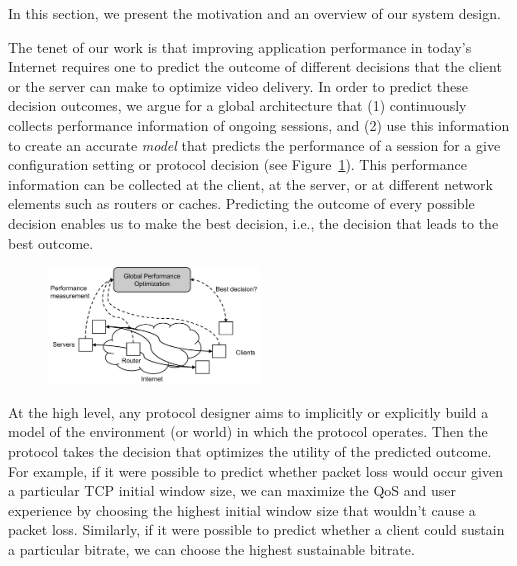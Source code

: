 \label{sec:overview}

In this section, we present the motivation and an overview of our
system design.

The tenet of our work is that improving application performance in
today's Internet requires one to predict the outcome of different
decisions that the client or the server can make to optimize video
delivery. In order to predict these decision outcomes,
we argue for a global architecture that (1) continuously collects
performance information of ongoing sessions, and (2) use this
information to create an accurate \emph{model} that predicts the
performance of a session for a give configuration setting or protocol
decision (see Figure~\ref{fig:global-control--overview}). This
performance information can be collected at the client, at the server,
or at different network elements such as routers or caches. Predicting
the outcome of every possible decision enables us to make the best
decision, i.e., the decision that leads to the best outcome.

\begin{figure}[h!]
\centering
 \includegraphics[width=0.5\textwidth] {figures/global-control-overview.pdf}
\label{fig:global-control--overview}
\end{figure}


At the high level, any protocol designer aims to implicitly or
explicitly build a model of the environment (or world) in which the
protocol operates. Then the protocol takes the decision that optimizes
the utility of the predicted outcome.  For example, if it were
possible to predict whether packet loss would occur given a particular
TCP initial window size, we can maximize the QoS and user experience
by choosing the highest initial window size that wouldn't cause a
packet loss.  Similarly, if it were possible to predict whether a
client could sustain a particular bitrate, we can choose the highest
sustainable bitrate.

